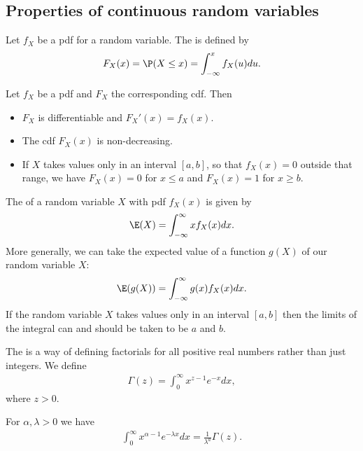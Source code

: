 \documentclass{article}
\begin{document}
\subsection{Properties of continuous random variables}
\begin{definition}
    Let $f_X$ be a pdf for a random variable. The  is defined by
    \begin{align*}
        F_X(x) = \P(X\leq x) = \int_{-\infty}^x f_X(u)du.
    \end{align*}
\end{definition}
\begin{proposition}
    Let $f_X$ be a pdf and $F_X$ the corresponding cdf. Then
    \begin{itemize}
        \item $F_X$ is differentiable and $F_X'(x) = f_X(x)$.
        \item The cdf $F_X(x)$ is non-decreasing.
        \item If $X$ takes values only in an interval $[a,b]$, so that
              $f_X(x)=0$ outside that range, we have
              $F_X(x)=0$ for $x\leq a$ and $F_X(x)=1$ for $x\geq b$.
    \end{itemize}
\end{proposition}
\begin{definition}
    The  of a random variable $X$ with pdf $f_X(x)$ 
    is given by
    \begin{align*}
        \E(X) = \int_{-\infty}^\infty xf_X(x) dx.
    \end{align*}
    More generally, we can take the expected value of a function 
    $g(X)$ of our random variable $X$:
    \begin{align*}
        \E(g(X)) = \int_{-\infty}^\infty g(x) f_X(x)dx.
    \end{align*}
    If the random variable $X$ takes values only in an interval
    $[a,b]$ then the limits of the integral can and should be taken
    to be $a$ and $b$.
\end{definition}
\begin{definition}
    The  is a way of defining factorials for all
    positive real numbers rather than just integers. We define
    \begin{align*}
        \Gamma(z) = \int_0^\infty x^{z-1}e^{-x}dx,
    \end{align*}
    where $z>0$.
\end{definition}
\begin{theorem}
    For $\alpha,\lambda>0$ we have
    \begin{align*}
        \int_0^\infty x^{\alpha -1}e^{-\lambda x} dx = \frac{1}{\lambda^a}\Gamma(z).
    \end{align*}
\end{theorem}
\end{document}
